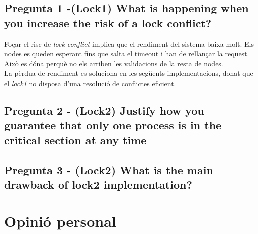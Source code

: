 \documentclass[a4paper, 11pt]{article}
\begin{document}

\subsection{Pregunta 1 -(Lock1) What is happening when you increase the risk of a lock conflict?}
Foçar el risc de \textit{lock conflict} implica que el rendiment del sistema baixa molt. Els nodes es queden esperant fins que salta el timeout i han de rellançar la request. Això es dóna perquè no els arriben les validacions de la resta de nodes. \\
La pèrdua de rendiment es soluciona en les següents implementacions, donat que el \textit{lock1} no disposa d'una resolució de conflictes eficient. 

\subsection{Pregunta 2 - (Lock2) Justify how you guarantee that only one process is in the critical section at any time}

\subsection{Pregunta 3 - (Lock2) What is the main drawback of lock2 implementation?}

\section{Opinió personal}
\end{document}
